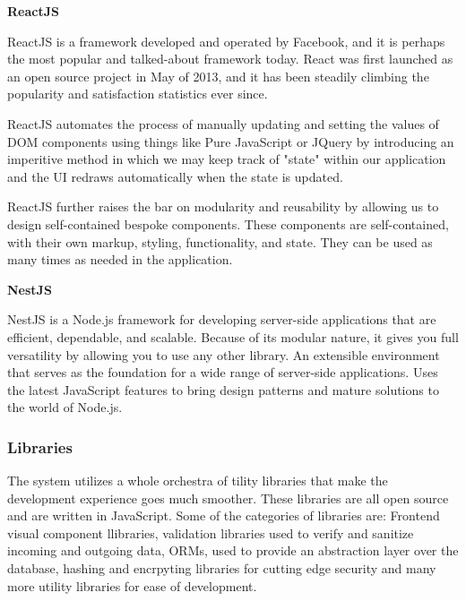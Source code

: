 \hspace{5mm}


\textbf{ReactJS}


ReactJS is a framework developed and operated by Facebook, and it is perhaps the most popular and talked-about framework today. React was first launched as an open source project in May of 2013, and it has been steadily climbing the popularity and satisfaction statistics ever since.


ReactJS automates the process of manually updating and setting the values of DOM components using things like Pure JavaScript or JQuery by introducing an imperitive method in which we may keep track of "state" within our application and the UI redraws automatically when the state is updated.


ReactJS further raises the bar on modularity and reusability by allowing us to design self-contained bespoke components. These components are self-contained, with their own markup, styling, functionality, and state. They can be used as many times as needed in the application.


\hspace{5mm}


\textbf{NestJS}


NestJS is a Node.js framework for developing server-side applications that are efficient, dependable, and scalable. Because of its modular nature, it gives you full versatility by allowing you to use any other library. An extensible environment that serves as the foundation for a wide range of server-side applications. Uses the latest JavaScript features to bring design patterns and mature solutions to the world of Node.js.

\newpage
\subsubsection{Libraries}

The system utilizes a whole orchestra of tility libraries that make the development experience goes much smoother. These libraries are all open source and are written in JavaScript. Some of the categories of libraries are: Frontend visual component llibraries, validation libraries used to verify and sanitize incoming and outgoing data, ORMs, used to provide an abstraction layer over the database, hashing and encrpyting libraries for cutting edge security and many more utility libraries for ease of development.

\hspace{5mm}



